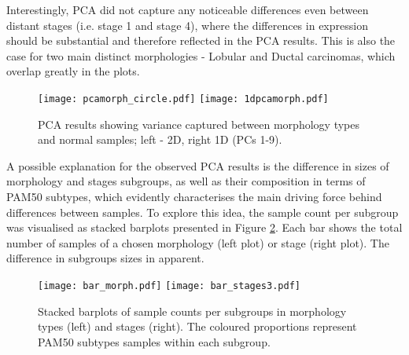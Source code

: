         Interestingly, PCA did not capture any noticeable differences even between distant stages (i.e. stage 1 and stage 4), where the differences in expression should be substantial and therefore reflected in the PCA results. This is also the case for two main distinct morphologies - Lobular and Ductal carcinomas, which overlap greatly in the plots.
    
            \begin{figure}[!h]
            \hspace*{\fill}
            \texttt{[image: pcamorph\_circle.pdf]}\hfill
            \texttt{[image: 1dpcamorph.pdf]}
            \hspace*{\fill}
            \caption[PCA plots (2D and 1D) showing separation by tumour morphologies]{PCA results showing variance captured between morphology types and normal samples; left - 2D, right 1D (PCs 1-9). }
            \label{fig:1dpcamorph}
            \end{figure}

    
    \newpage
    A possible explanation for the observed PCA results is the difference in sizes of morphology and stages subgroups, as well as their composition in terms of PAM50 subtypes, which evidently characterises the main driving force behind differences between samples. To explore this idea, the sample count per subgroup was visualised as stacked barplots presented in Figure \ref{fig:barms}. Each bar shows the total number of samples of a chosen morphology (left plot) or stage (right plot). The difference in subgroups sizes in apparent.
       
        \begin{figure}[!h]
        \centering
        \texttt{[image: bar\_morph.pdf]}\hfill
        \texttt{[image: bar\_stages3.pdf]}
        \caption[Stacked barplots of samples count per stage and morphology type]{Stacked barplots of sample counts per subgroups in morphology types (left) and stages (right). The coloured proportions represent PAM50 subtypes samples within each subgroup.}
        \label{fig:barms}
        \end{figure}
        
